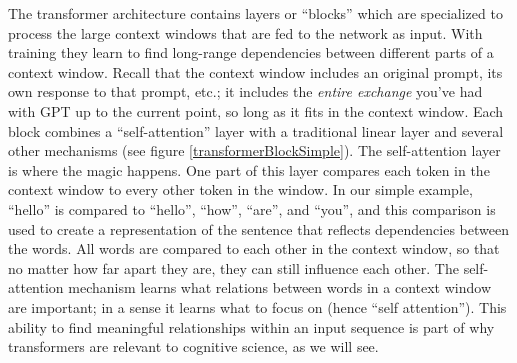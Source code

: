 The transformer architecture \cite{vaswani2017attention} contains layers or ``blocks'' which are specialized to process the large context windows that are fed to the network as input. With training they learn to find long-range dependencies between different parts of a context window. Recall that the context window  includes an original prompt, its own response to that prompt, etc.; it includes the \emph{entire exchange} you've had with GPT up to the current point, so long as it fits in the context window. Each block combines  a ``self-attention'' layer with a traditional linear layer and several other mechanisms (see figure \ref{transformerBlockSimple}). The self-attention layer is where the magic happens. One part of this layer compares each token in the context window to every other token in the window. In our simple example, ``hello'' is compared to ``hello'', ``how'', ``are'', and ``you'', and this comparison is used to create a representation of the sentence that reflects dependencies between the words. All words are compared to each other in the context window, so that no matter how far apart they are, they can still influence each other. The self-attention mechanism learns what relations between words in a context window are important; in a sense it learns what to focus on (hence ``self attention''). This ability to find meaningful relationships within an input sequence is part of why transformers are relevant to cognitive science, as we will see.

